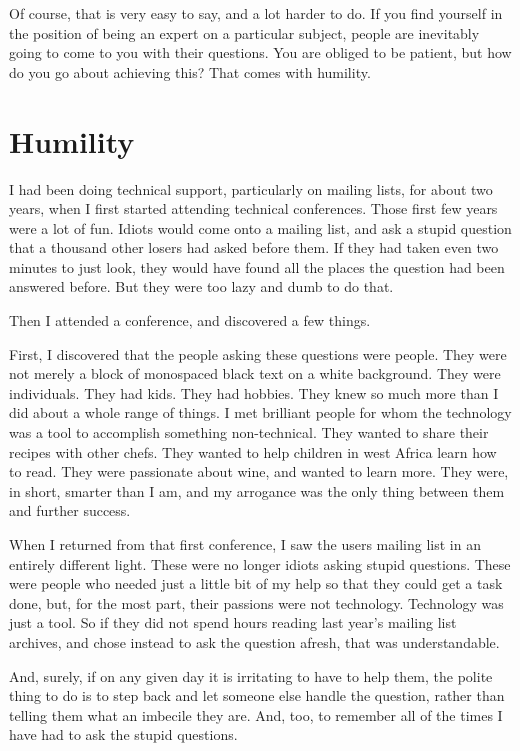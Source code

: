 Of course, that is very easy to say, and a lot harder to do. If you find
yourself in the position of being an expert on a particular subject, people are
inevitably going to come to you with their questions.
You are obliged to be patient, but how do you go about achieving this? That
comes with humility.

\section*{Humility}
I had been doing technical support, particularly on mailing lists, for about two
years, when I first started attending technical conferences. Those first few
years were a lot of fun. Idiots would come onto a mailing list, and ask a stupid
question that a thousand other losers had asked before them. If they had taken
even two minutes to just look, they would have found all the places the question
had been answered before. But they were too lazy and dumb to do that.

Then I attended a conference, and discovered a few things.

First, I discovered that the people asking these questions were people. They
were not merely a block of monospaced black text on a white background. They
were individuals. They had kids. They had hobbies. They knew so much more than I
did about a whole range of things. I met brilliant people for whom the
technology was a tool to accomplish something non-technical. They wanted to
share their recipes with other chefs. They wanted to help children in west
Africa learn how to read. They were passionate about wine, and wanted to learn
more. They were, in short, smarter than I am, and my arrogance was the only
thing between them and further success.

When I returned from that first conference, I saw the users mailing list in an
entirely different light. These were no longer idiots asking stupid questions.
These were people who needed just a little bit of my help so that they could get
a task done, but, for the most part, their passions were not technology.
Technology was just a tool. So if they did not spend hours reading last year’s
mailing list archives, and chose instead to ask the question afresh, that was
understandable.

And, surely, if on any given day it is irritating to have to help them, the
polite thing to do is to step back and let someone else handle the question,
rather than telling them what an imbecile they are. And, too, to remember all of
the times I have had to ask the stupid questions.

